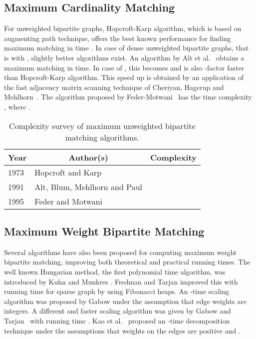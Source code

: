 \documentclass[runningheads,a4paper]{llncs}
\begin{document}
\subsection{Maximum Cardinality Matching}
For unweighted bipartite graphs, Hopcroft-Karp \cite{hopcroft73}
algorithm, which is based on augmenting path technique, offers
the best known performance for finding maximum matching in time
. In case of dense unweighted bipartite graphs, that is with
, slightly better algorithms exist.
An algorithm by Alt et al.~\cite{alt91} obtains a maximum matching in
 time. In case of , this
becomes  and is also 
-factor
faster than Hopcroft-Karp algorithm. This speed up is obtained by an
application of the fast adjacency matrix scanning technique of Cheriyan,
Hagerup and Mehlhorn~\cite{cheriyan90}. The algorithm proposed by Feder-Motwani~\cite{feder95} has the time complexity 
, where
.
\vfill
\begin{table*}[htpb]\centering
\caption{Complexity survey of maximum unweighted bipartite matching algorithms.}
\label{Table:MUWBM}
\begin{tabular}{|l|l|l|} 	\hline
\multicolumn{1}{|c|}{\bf Year}	& \multicolumn{1}{|c|}{\bf Author(s)}	& \multicolumn{1}{|c|}{\bf Complexity}\\
\hline
1973  & Hopcroft and Karp \cite{hopcroft73}  		& 	\\
\hline
1991 & Alt, Blum, Mehlhorn and Paul \cite{alt91} 	&  \\
\hline
1995  &Feder and Motwani \cite{feder95}	  		&  \\
\hline
\end{tabular}
\end{table*}






\vspace*{1cm}
\subsection{Maximum Weight Bipartite Matching}
Several algorithms have also been proposed for computing maximum weight
bipartite matching, improving both theoretical and practical running
times. The well known Hungarian method, the first polynomial time
algorithm, was introduced by Kuhn \cite{kuhn55} and Munkres
\cite{munkres57}. Fredman and Tarjan \cite{fredman87} improved this with
running time  for sparse graph by using Fibonacci heaps. An 
-time scaling algorithm was proposed by
Gabow \cite{gabow85} under the assumption
that edge weights are integers. A different and faster scaling algorithm was given by
Gabow and Tarjan~\cite{gabow89} with running time
. Kao et al.~\cite{kao02} proposed an
-time decomposition technique
under the assumptions that weights on the edges are positive and .
\end{document}
